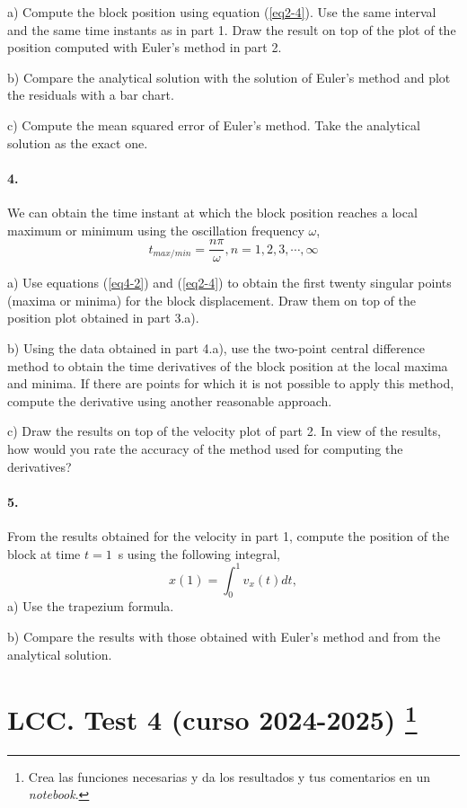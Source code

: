 a) Compute the block position using equation (\ref{eq2-4}). Use the same interval and the same time instants as in part 1. Draw the result on top of the plot of the position computed with Euler's method in part 2.

b) Compare the analytical solution with the solution of Euler's method and plot the residuals with a bar chart.

c) Compute the mean squared error of Euler's method. Take the analytical solution as the exact one.  

\paragraph{4.} We can obtain the time instant at which the block position reaches a local maximum or minimum using the oscillation frequency $\omega$,
\begin{equation}\label{eq4-2}
t_{max/min} = \frac{n \pi}{\omega}, n = 1,2,3,\cdots, \infty
\end{equation}

a) Use equations (\ref{eq4-2}) and (\ref{eq2-4}) to obtain the first twenty singular points (maxima or minima) for the block displacement. Draw them on top of the position plot obtained in part 3.a).  

b) Using the data obtained in part 4.a), use the two-point central difference method to obtain the time derivatives of the block position at the local maxima and minima. If there are points for which it is not possible to apply this method, compute the derivative using another reasonable approach.

c) Draw the results on top of the velocity plot of part 2. In view of the results, how would you rate the accuracy of the method used for computing the derivatives?

\paragraph{5.} From the results obtained for the velocity in part 1, compute the position of the block at time $t=1$~s using the following integral,  
\begin{equation}
x(1) = \int_0^1v_x(t)dt,
\end{equation}
a) Use the trapezium formula.

b) Compare the results with those obtained with Euler's method and from the analytical solution.

\section{LCC. Test 4 (curso 2024-2025) \protect\footnote{Crea las funciones necesarias y da los resultados y tus comentarios en un \emph{notebook}.}}

